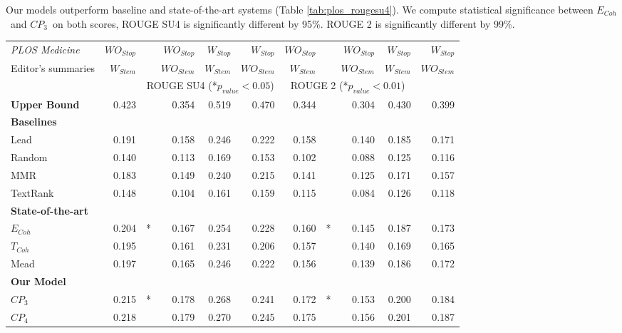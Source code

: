Our models outperform baseline and state-of-the-art systems
(Table  \ref{tab:plos_rougesu4}). We compute statistical significance between \emph{$E_{Coh}$}\ and \emph{$CP_3$}\ on both scores, ROUGE SU4 is significantly different by 95\%. ROUGE 2 is significantly different by 99\%.

\begin{table*}[!ht]
\centering
\small
\begin{tabular}{@{}l|r@{}l|r|r|r||r@{}l|r|r|r@{}}
\emph{PLOS Medicine}& $WO_{Stop}$& & $WO_{Stop}$ & $W_{Stop}$ & $W_{Stop}$ & $WO_{Stop}$& & $WO_{Stop}$ & $W_{Stop}$ & $W_{Stop}$ \\
Editor's summaries  & $W_{Stem}$ & & $WO_{Stem}$ &$W _{Stem}$ & $WO_{Stem}$ & $W_{Stem}$ & & $WO_{Stem}$ &$W _{Stem}$ & $WO_{Stem}$ \\\hline
&& \multicolumn{4}{c||}{ROUGE SU4 (*$p_{value}<0.05$)} & \multicolumn{4}{c}{ROUGE 2 (*$p_{value}<0.01$)}\\\hline
\textbf{Upper Bound} & 0.423 & & 0.354 &0.519 &0.470  & 0.344 & & 0.304 & 0.430 & 0.399  \\\hline
 \textbf{Baselines} & & & & & & & & & &\\
Lead & 0.191 & & 0.158 & 0.246 & 0.222  & 0.158 & & 0.140 &0.185 &0.171   \\
Random &  0.140& & 0.113 & 0.169  & 0.153 &  0.102 & & 0.088 & 0.125 & 0.116 \\
MMR & 0.183& & 0.149 & 0.240 & 0.215 & 0.141 & & 0.125 & 0.171 &0.157 \\
TextRank & 0.148& & 0.104 & 0.161 & 0.159 & 0.115 & & 0.084 &0.126 & 0.118\\\hline
\textbf{State-of-the-art} & & & & & & & & & & \\
$E_{Coh}$ & 0.204&* & 0.167 & 0.254& 0.228 &0.160 &* & 0.145 &0.187 & 0.173\\
$T_{Coh}$\ & 0.195 & &0.161 & 0.231 &0.206 & 0.157 &  & 0.140 &0.169 & 0.165 \\
Mead & 0.197 & & 0.165 & 0.246 & 0.222& 0.156 & &0.139 & 0.186 & 0.172 \\\hline
\textbf{Our Model} & & & & & & & & & &\\
$CP_3$ &0.215& * &0.178& 0.268& 0.241& 0.172 & * & 0.153 & 0.200 &0.184 \\
$CP_4$ & 0.218& & 0.179 & 0.270 & 0.245  & 0.175 & & 0.156&0.201 & 0.187 \\
\hline
\end{tabular}
\caption{ROUGE scores on \emph{PLOS Medicine} with \textbf{750 words}.}
\label{tab:plos_rougesu4}
\end{table*}


